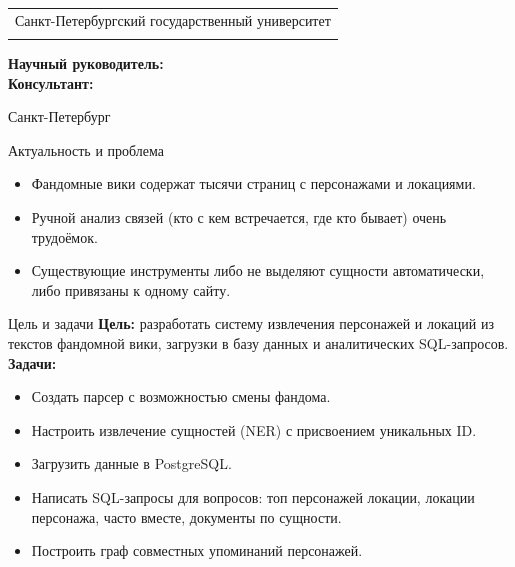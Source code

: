 \documentclass[russian, aspectratio=1610]{beamer}
\title[Анализ связей в фандомных вселенных]{\my@title@title@ru}
\author[\my@title@author@ru]{\my@title@author@ru, группа \academicGroup}
\institute[СПбГУ]{}
\date{}
\makeatletter
\newcommand{\advisorChair}{\my@title@chair@ru}
\newcommand{\supervisor}{\my@title@supervisor@ru}
\newcommand{\supervisorPosition}{\my@title@supervisorPosition@ru}
\newcommand{\consultant}{\my@title@consultant@ru}
\newcommand{\consultantPosition}{\my@title@consultantPosition@ru}
\newcommand{\reviewer}{\my@title@reviewer@ru}
\newcommand{\reviewerPosition}{\my@title@reviewerPosition@ru}
\newcommand{\defenseYear}{\my@title@year@ru}
\makeatother
\begin{document}
{

\begin{frame}
    \vspace{15pt}
    \begin{center}
        \begin{tabular}{c}
            \scriptsize{Санкт-Петербургский государственный университет} \\
            \scriptsize{\advisorChair}
        \end{tabular}
        \titlepage
    \end{center}
    \btVFill
    {\scriptsize
        \textbf{Научный руководитель:}  \supervisorPosition~\supervisor \\
        \textbf{Консультант:}  \consultantPosition~\consultant \\
    }
    \begin{center}
        \vspace{5pt}
        \scriptsize{Санкт-Петербург\\ \defenseYear}
    \end{center}
\end{frame}
}

\begin{frame}{Актуальность и проблема}
    \begin{itemize}
        \item Фандомные вики содержат тысячи страниц с персонажами и локациями.
        \item Ручной анализ связей (кто с кем встречается, где кто бывает) очень трудоёмок.
        \item Существующие инструменты либо не выделяют сущности автоматически, либо привязаны к одному сайту.
    \end{itemize}
\end{frame}

\begin{frame}{Цель и задачи}
    \textbf{Цель:} разработать систему извлечения персонажей и локаций из текстов фандомной вики, загрузки в базу данных и аналитических SQL-запросов. \\
    \vspace{1em}
    \textbf{Задачи:}
    \begin{itemize}
        \item Создать парсер с возможностью смены фандома.
        \item Настроить извлечение сущностей (NER) с присвоением уникальных ID.
        \item Загрузить данные в PostgreSQL.
        \item Написать SQL-запросы для вопросов: топ персонажей локации, локации персонажа, часто вместе, документы по сущности.
        \item Построить граф совместных упоминаний персонажей.
    \end{itemize}
\end{frame}
\end{document}
